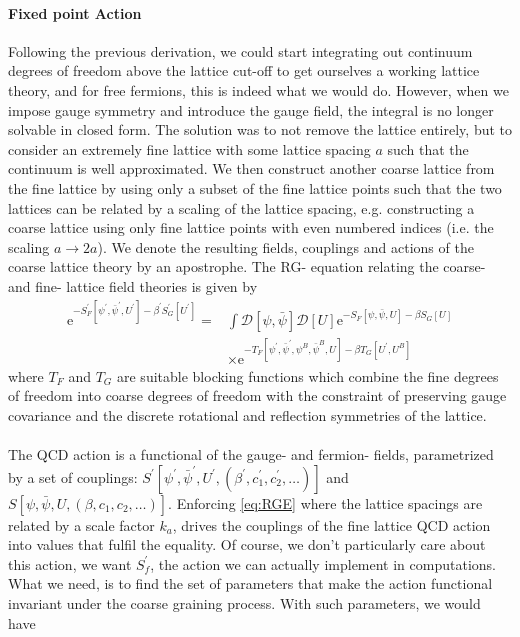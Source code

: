 \documentclass[a4paper,10pt]{article}
\begin{document}
\paragraph{Fixed point Action}
Following the previous derivation, we could start integrating out continuum degrees of freedom above the lattice cut-off to get ourselves a working lattice theory, and for free fermions, this is indeed what we would do. However, when we impose gauge symmetry and introduce the gauge field, the integral is no longer solvable in closed form. The solution was to not remove the lattice entirely, but to consider an extremely fine lattice with some lattice spacing $a$ such that the continuum is well approximated. We then construct another coarse lattice from the fine lattice by using only a subset of the fine lattice points such that the two lattices can be related by a scaling of the lattice spacing, e.g. constructing a coarse lattice using only fine lattice points with even numbered indices (i.e. the scaling $a\rightarrow 2a$). We denote the resulting fields, couplings and actions of the coarse lattice theory by an apostrophe. The RG- equation relating the coarse- and fine- lattice field theories is given by
\begin{equation}\label{eq:RGE}
\begin{aligned} 
\mathrm{e}^{-S_{F}^{\prime}\left[\psi^{\prime}, \bar{\psi}^{\prime}, U^{\prime}\right]-\beta^{\prime} S_{G}^{\prime}\left[U^{\prime}\right]}=&\int \mathcal{D}[\psi, \bar{\psi}] \mathcal{D}[U] \mathrm{e}^{-S_{F}[\psi, \bar{\psi}, U]-\beta S_{G}[U]}\\&\times \mathrm{e}^{-T_{F}\left[\psi^{\prime}, \bar{\psi}^{\prime}, \psi^{B}, \bar{\psi}^{B}, U\right]-\beta T_{G}\left[U^{\prime}, U^{B}\right]}
\end{aligned}
\end{equation}
where $T_F$ and $T_G$ are suitable blocking functions which combine the fine degrees of freedom into coarse degrees of freedom with the constraint of preserving gauge covariance and the discrete rotational and reflection symmetries of the lattice.\\\\The QCD action is a functional of the gauge- and fermion- fields, parametrized by a set of couplings: $S^{\prime}\left[ \psi^{\prime}, \bar{\psi}^{\prime}, U^{\prime}, (\beta^{\prime},c_1^{\prime},c_2^{\prime},\ldots) \right]$ and $S\left[ \psi, \bar{\psi}, U, (\beta,c_1,c_2,\ldots) \right]$. Enforcing \eqref{eq:RGE} where the lattice spacings are related by a scale factor $k_a$, drives the couplings of the fine lattice QCD action into values that fulfil the equality. Of course, we don't particularly care about this action, we want $S^\prime_f$, the action we can actually implement in computations. What we need, is to find the set of parameters that make the action functional invariant under the coarse graining process. With such parameters, we would have
\end{document}
